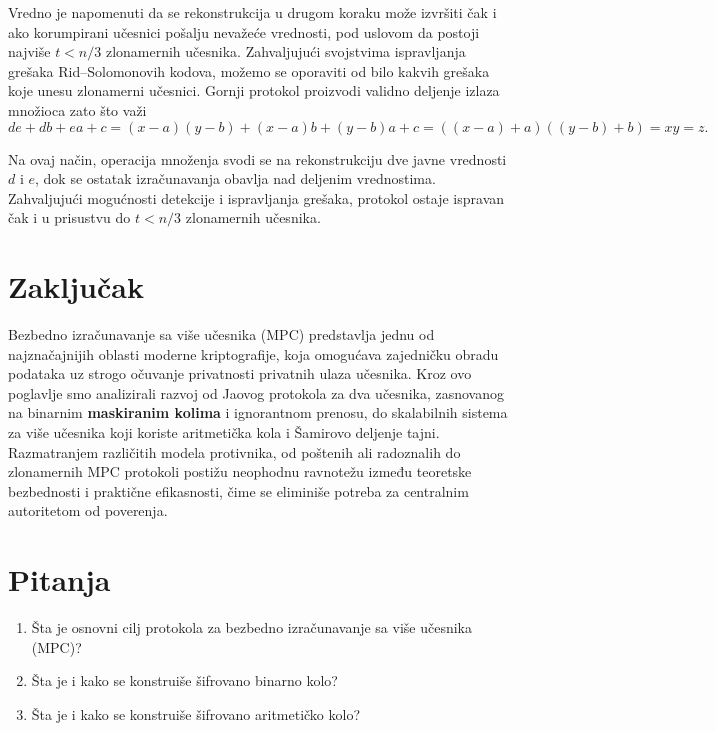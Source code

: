 Vredno je napomenuti da se rekonstrukcija u drugom koraku može izvršiti čak i ako korumpirani
učesnici pošalju nevažeće vrednosti, pod uslovom da postoji najviše $t < n/3$ zlonamernih
učesnika. Zahvaljujući svojstvima ispravljanja grešaka Rid--Solomonovih kodova, možemo se
oporaviti od bilo kakvih grešaka koje unesu zlonamerni učesnici. Gornji protokol proizvodi
validno deljenje izlaza množioca zato što važi~\cite{smart2016cryptography}
\[
d e + d b + e a + c = (x-a)(y-b) + (x-a)b + (y-b)a + c
= ((x-a)+a)((y-b)+b) = x y = z.
\]

Na ovaj način, operacija množenja svodi se na rekonstrukciju dve javne vrednosti $d$ i $e$, dok se ostatak izračunavanja obavlja nad deljenim vrednostima. Zahvaljujući mogućnosti detekcije i ispravljanja grešaka, protokol ostaje ispravan čak i u prisustvu do $t<n/3$ zlonamernih učesnika.


\section{Zaključak} 

Bezbedno izračunavanje sa više učesnika (MPC) predstavlja jednu od najznačajnijih oblasti moderne kriptografije, koja omogućava zajedničku obradu podataka uz strogo očuvanje privatnosti privatnih ulaza učesnika. Kroz ovo poglavlje smo analizirali razvoj od Jaovog protokola za dva učesnika, zasnovanog na binarnim \textbf{maskiranim kolima} i ignorantnom prenosu, do skalabilnih sistema za više učesnika koji koriste aritmetička kola i Šamirovo deljenje tajni. Razmatranjem različitih modela protivnika, od poštenih ali radoznalih do zlonamernih MPC protokoli postižu neophodnu ravnotežu između teoretske bezbednosti i praktične efikasnosti, čime se eliminiše potreba za centralnim autoritetom od poverenja.

\section{Pitanja}

\begin{enumerate}
    \item Šta je osnovni cilj protokola za bezbedno izračunavanje sa više učesnika (MPC)?
    \item Šta je i kako se konstruiše šifrovano binarno kolo?
    \item Šta je i kako se konstruiše šifrovano aritmetičko kolo?
\end{enumerate}
